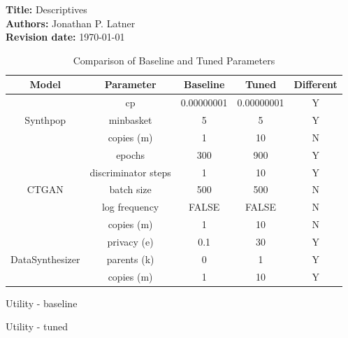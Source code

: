 \documentclass[12pt]{article}
\begin{document}
{\bf Title:} Descriptives \\
{\bf Authors:} Jonathan P. Latner \\
{\bf Revision date:} \today

\begin{table}[htbp]
\centering
\caption{Comparison of Baseline and Tuned Parameters}
\begin{tabular}{|c|c|c|c|c|}
\hline
\textbf{Model} & \textbf{Parameter} & \textbf{Baseline} & \textbf{Tuned} & \textbf{Different} \\ \hline
\multirow{3}{*}{Synthpop}   & cp            & 0.00000001    & 0.00000001& Y \\                            & minbasket     & 5             & 5         & Y \\ 
                            & copies (m)    & 1             & 10        & N \\ \hline
\multirow{5}{*}{CTGAN}      & epochs            & 300   & 900   & Y \\ 
                        & discriminator steps   & 1     & 10    & Y \\ 
                        & batch size            & 500   & 500   & N \\ 
                        & log frequency         & FALSE & FALSE & N \\ 
                        & copies (m)            & 1     & 10    & N \\ \hline
\multirow{4}{*}{DataSynthesizer} & privacy (e)  & 0.1   & 30    & Y  \\ 
                        & parents (k)           & 0     & 1     & Y  \\ 
                        & copies (m)            & 1     & 10    & Y  \\ \hline
\end{tabular}
\end{table}


\begin{table}[!h]
    \caption{Utility - baseline}
    \centering
    \resizebox{.8\textwidth}{!}{}
    \label{table_utility_baseline}
\end{table}

\begin{table}[!h]
    \caption{Utility - tuned}
    \centering
    \resizebox{.8\textwidth}{!}{}
    \label{table_utility_tuned}
\end{table}
\end{document}
